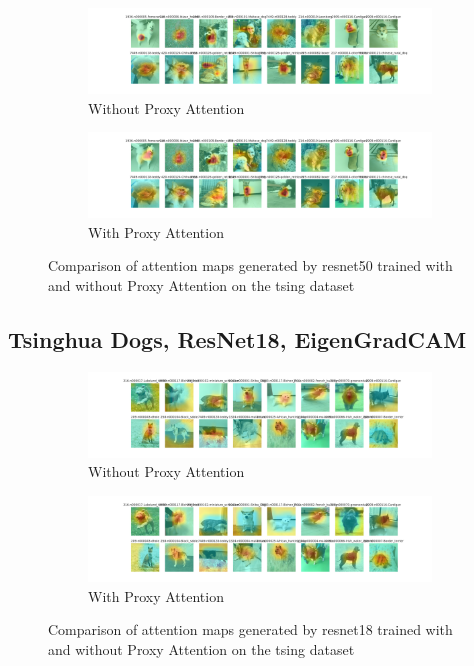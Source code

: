 \begin{figure}[!htb]
    \centering
    \begin{subfigure}[b]{1\textwidth}
        \includegraphics[width=\textwidth]{images/gpp_tsing_resnet50_noproxy_3.pdf}
        \caption{Without Proxy Attention}
    \end{subfigure}
    \hfill
    \begin{subfigure}[b]{1\textwidth}
        \includegraphics[width=\textwidth]{images/gpp_tsing_resnet50_proxy_3.pdf}
        \caption{With Proxy Attention}
    \end{subfigure}
    \caption{Comparison of attention maps generated by resnet50 trained with and without Proxy Attention on the tsing dataset}
\end{figure}


\subsection{Tsinghua Dogs, ResNet18, EigenGradCAM}
\begin{figure}[!htb]
    \centering
    \begin{subfigure}[b]{1\textwidth}
        \includegraphics[width=\textwidth]{images/tsing_resnet18_noproxy_1.pdf}
        \caption{Without Proxy Attention}
    \end{subfigure}
    \hfill
    \begin{subfigure}[b]{1\textwidth}
        \includegraphics[width=\textwidth]{images/tsing_resnet18_proxy_1.pdf}
        \caption{With Proxy Attention}
    \end{subfigure}
    \caption{Comparison of attention maps generated by resnet18 trained with and without Proxy Attention on the tsing dataset}
\end{figure}


